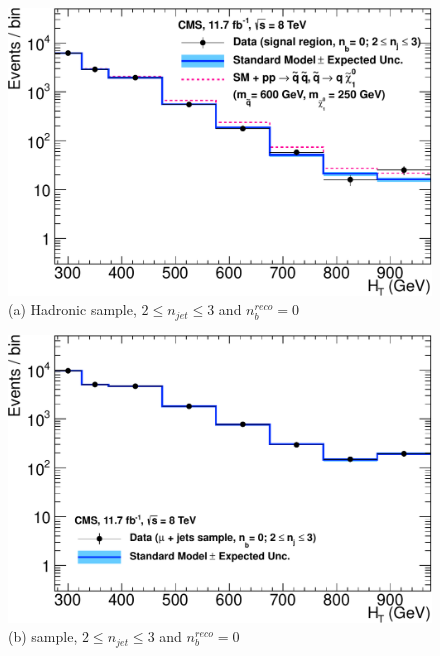 \begin{figure}[ht]
\footnotesize
\centering
\begin{minipage}[b]{0.48 \linewidth}
\includegraphics[width = 1.0\linewidth]{plots/hadronic_0b_le3j_logy.pdf}
\centering (a)  Hadronic sample, $2 \leq n_{jet} \leq 3$ and $n_{b}^{reco} = 0$ 
\end{minipage}
\quad
\begin{minipage}[b]{0.48\linewidth}
\includegraphics[width = 1.0\linewidth]{plots/muon_0b_le3j_logy.pdf}
\centering (b)  \mupjets sample, $2 \leq n_{jet} \leq 3$ and $n_{b}^{reco} = 0$  
\end{minipage} \\
\vspace{0.4cm}
\begin{minipage}[b]{0.48 \linewidth}

\end{minipage}
\end{figure}
